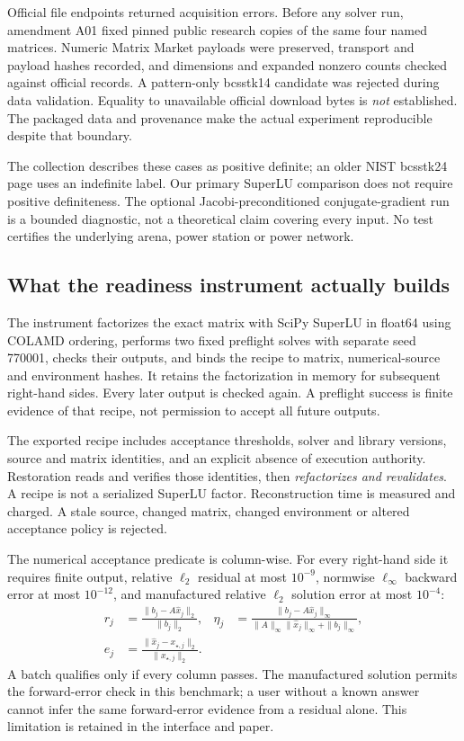 \documentclass[11pt,a4paper]{article}
\begin{document}
Official file endpoints returned acquisition errors. Before any solver run, amendment A01 fixed pinned public research copies of the same four named matrices. Numeric Matrix Market payloads were preserved, transport and payload hashes recorded, and dimensions and expanded nonzero counts checked against official records. A pattern-only bcsstk14 candidate was rejected during data validation. Equality to unavailable official download bytes is \emph{not} established. The packaged data and provenance make the actual experiment reproducible despite that boundary.

The collection describes these cases as positive definite; an older NIST bcsstk24 page uses an indefinite label. Our primary SuperLU comparison does not require positive definiteness. The optional Jacobi-preconditioned conjugate-gradient run is a bounded diagnostic, not a theoretical claim covering every input. No test certifies the underlying arena, power station or power network.

\subsection{What the readiness instrument actually builds}
The instrument factorizes the exact matrix with SciPy SuperLU in float64 using COLAMD ordering, performs two fixed preflight solves with separate seed 770001, checks their outputs, and binds the recipe to matrix, numerical-source and environment hashes. \citep{scipySplu} It retains the factorization in memory for subsequent right-hand sides. Every later output is checked again. A preflight success is finite evidence of that recipe, not permission to accept all future outputs.

The exported recipe includes acceptance thresholds, solver and library versions, source and matrix identities, and an explicit absence of execution authority. Restoration reads and verifies those identities, then \emph{refactorizes and revalidates}. A recipe is not a serialized SuperLU factor. Reconstruction time is measured and charged. A stale source, changed matrix, changed environment or altered acceptance policy is rejected.

The numerical acceptance predicate is column-wise. For every right-hand side it requires finite output, relative $\ell_2$ residual at most $10^{-9}$, normwise $\ell_\infty$ backward error at most $10^{-12}$, and manufactured relative $\ell_2$ solution error at most $10^{-4}$:
\begin{align}
r_j&=\frac{\|b_j-A\hat x_j\|_2}{\|b_j\|_2}, &
\eta_j&=\frac{\|b_j-A\hat x_j\|_\infty}{\|A\|_\infty\|\hat x_j\|_\infty+\|b_j\|_\infty},\\
e_j&=\frac{\|\hat x_j-x_{\star,j}\|_2}{\|x_{\star,j}\|_2}.&&
\end{align}
A batch qualifies only if every column passes. The manufactured solution permits the forward-error check in this benchmark; a user without a known answer cannot infer the same forward-error evidence from a residual alone. This limitation is retained in the interface and paper.
\end{document}
